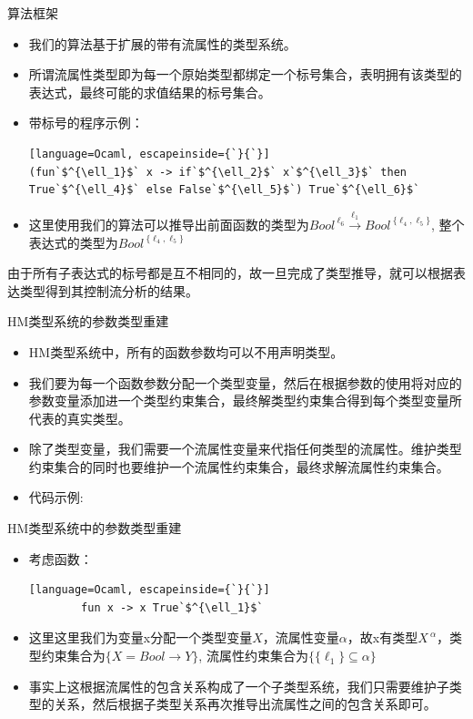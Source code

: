 \documentclass[9pt]{beamer}
\begin{document}
\begin{frame}[fragile]{算法框架}
	\begin{itemize}
		\item 我们的算法基于扩展的带有流属性的类型系统。
		\vspace{0.5em}
		\item 所谓流属性类型即为每一个原始类型都绑定一个标号集合，表明拥有该类型的表达式，最终可能的求值结果的标号集合。
		\item 带标号的程序示例：
		\begin{lstlisting}[language=Ocaml, escapeinside={`}{`}]
(fun`$^{\ell_1}$` x -> if`$^{\ell_2}$` x`$^{\ell_3}$` then True`$^{\ell_4}$` else False`$^{\ell_5}$`) True`$^{\ell_6}$`
		\end{lstlisting}
		\item 这里使用我们的算法可以推导出前面函数的类型为$Bool^{\ \ell_6}\xrightarrow{\ell_1}Bool^{\ \{\ell_4, \ell_5\}}$, 整个表达式的类型为$Bool^{\ \{\ell_4, \ell_5\}}$
	\end{itemize}
	\vspace{0.2em}
	由于所有子表达式的标号都是互不相同的，故一旦完成了类型推导，就可以根据表达类型得到其控制流分析的结果。
\end{frame}

\begin{frame}[fragile]{HM类型系统的参数类型重建}
	\begin{itemize}
		\item HM类型系统中，所有的函数参数均可以不用声明类型。
		\vspace{0.3em}
		\item 我们要为每一个函数参数分配一个类型变量，然后在根据参数的使用将对应的参数变量添加进一个类型约束集合，最终解类型约束集合得到每个类型变量所代表的真实类型。
		\vspace{0.3em}
		\item 除了类型变量，我们需要一个流属性变量来代指任何类型的流属性。维护类型约束集合的同时也要维护一个流属性约束集合，最终求解流属性约束集合。
		\vspace{0.3em}
		\item 代码示例: 
	\end{itemize}
\end{frame}

\begin{frame}[fragile]{HM类型系统中的参数类型重建}
	\begin{itemize}
		\item 考虑函数：
		\begin{lstlisting}[language=Ocaml, escapeinside={`}{`}]
		fun x -> x True`$^{\ell_1}$`
		\end{lstlisting}
		\item 这里这里我们为变量x分配一个类型变量$X$，流属性变量$\alpha$，故x有类型$X^{\ \alpha}$，类型约束集合为$\{X = Bool \to Y\}$, 流属性约束集合为$\{\{\ell_1\}\subseteq\alpha\}$
		\vspace{0.3em}
		\item 事实上这根据流属性的包含关系构成了一个子类型系统，我们只需要维护子类型的关系，然后根据子类型关系再次推导出流属性之间的包含关系即可。
	\end{itemize}
\end{frame}
\end{document}
